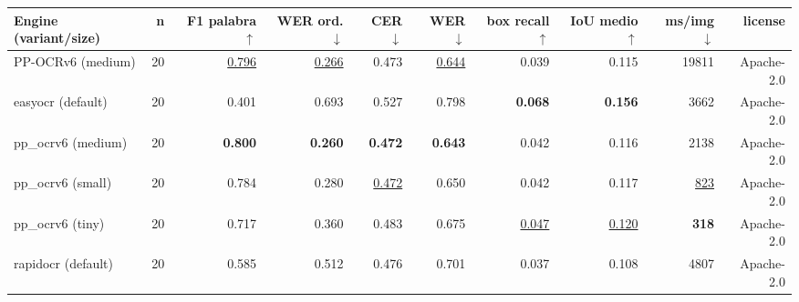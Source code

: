\documentclass[border=2pt]{standalone}
\begin{document}
\begin{tabular}{lrrrrrrrrr}
\toprule
Engine (variant/size) & n & F1 palabra $\uparrow$ & WER ord. $\downarrow$ & CER $\downarrow$ & WER $\downarrow$ & box recall $\uparrow$ & IoU medio $\uparrow$ & ms/img $\downarrow$ & license \\
\midrule
PP-OCRv6 (medium) & 20 & \underline{0.796} & \underline{0.266} & 0.473 & \underline{0.644} & 0.039 & 0.115 & 19811 & Apache-2.0 \\
easyocr (default) & 20 & 0.401 & 0.693 & 0.527 & 0.798 & \textbf{0.068} & \textbf{0.156} & 3662 & Apache-2.0 \\
pp\_ocrv6 (medium) & 20 & \textbf{0.800} & \textbf{0.260} & \textbf{0.472} & \textbf{0.643} & 0.042 & 0.116 & 2138 & Apache-2.0 \\
pp\_ocrv6 (small) & 20 & 0.784 & 0.280 & \underline{0.472} & 0.650 & 0.042 & 0.117 & \underline{823} & Apache-2.0 \\
pp\_ocrv6 (tiny) & 20 & 0.717 & 0.360 & 0.483 & 0.675 & \underline{0.047} & \underline{0.120} & \textbf{318} & Apache-2.0 \\
rapidocr (default) & 20 & 0.585 & 0.512 & 0.476 & 0.701 & 0.037 & 0.108 & 4807 & Apache-2.0 \\
\bottomrule
\end{tabular}
\par{}
\end{document}
